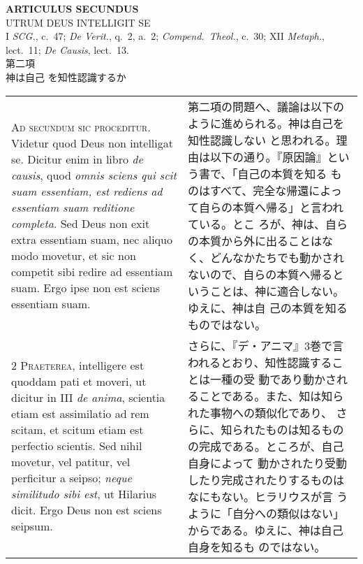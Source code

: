 \documentclass[10pt]{jsarticle} %
\begin{document}
\newpage

\begin{center}
{\Large {\bf ARTICULUS SECUNDUS}}\\ {\large UTRUM DEUS INTELLIGIT
SE}\\ {\footnotesize I {\itshape SCG.}, c.~47; {\itshape De Verit.},
q.~2, a.~2; {\itshape Compend.~Theol.}, c.~30; XII {\itshape Metaph.},
lect.~11; {\itshape De Causis}, lect.~13.}\\ {\Large 第二項\\神は自己
を知性認識するか}
\end{center}

\begin{longtable}{p{21em}p{21em}}

{\huge A}{\scshape d secundum sic proceditur}. Videtur quod Deus non
intelligat se. Dicitur enim in libro {\itshape de causis}, quod
{\itshape omnis sciens qui scit suam essentiam, est rediens ad
essentiam suam reditione completa}. Sed Deus non exit extra essentiam
suam, nec aliquo modo movetur, et sic non competit sibi redire ad
essentiam suam. Ergo ipse non est sciens essentiam suam.


&

第二項の問題へ、議論は以下のように進められる。神は自己を知性認識しない
と思われる。理由は以下の通り。『原因論』という書で、「自己の本質を知る
ものはすべて、完全な帰還によって自らの本質へ帰る」と言われている。とこ
ろが、神は、自らの本質から外に出ることはなく、どんなかたちでも動かされ
ないので、自らの本質へ帰るということは、神に適合しない。ゆえに、神は自
己の本質を知るものではない。

\\


{\scshape 2 Praeterea}, intelligere est quoddam pati et moveri, ut
dicitur in III {\itshape de anima}, scientia etiam est assimilatio ad
rem scitam, et scitum etiam est perfectio scientis. Sed nihil movetur,
vel patitur, vel perficitur a seipso; {\itshape neque similitudo sibi
est}, ut Hilarius dicit. Ergo Deus non est sciens seipsum.


&

さらに、『デ・アニマ』3巻で言われるとおり、知性認識することは一種の受
動であり動かされることである。また、知は知られた事物への類似化であり、
さらに、知られたものは知るものの完成である。ところが、自己自身によって
動かされたり受動したり完成されたりするものはなにもない。ヒラリウスが言
うように「自分への類似はない」からである。ゆえに、神は自己自身を知るも
のではない。

\\



\end{longtable}
\end{document}
